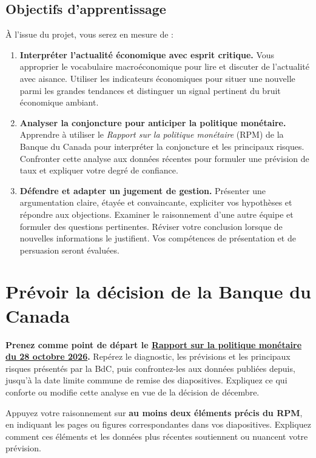 \documentclass[11pt,letterpaper]{article}
\begin{document}
\subsection{Objectifs d'apprentissage}
À l'issue du projet, vous serez en mesure de :
\begin{enumerate}
  \item \textbf{Interpréter l'actualité économique avec esprit critique.} Vous approprier le vocabulaire macroéconomique pour lire et discuter de l'actualité avec aisance. Utiliser les indicateurs économiques pour situer une nouvelle parmi les grandes tendances et distinguer un signal pertinent du bruit économique ambiant.
  \item \textbf{Analyser la conjoncture pour anticiper la politique monétaire.} Apprendre à utiliser le \textit{Rapport sur la politique monétaire} (RPM) de la Banque du Canada pour interpréter la conjoncture et les principaux risques. Confronter cette analyse aux données récentes pour formuler une prévision de taux et expliquer votre degré de confiance.
  \item \textbf{Défendre et adapter un jugement de gestion.} Présenter une argumentation claire, étayée et convaincante, expliciter vos hypothèses et répondre aux objections. Examiner le raisonnement d'une autre équipe et formuler des questions pertinentes. Réviser votre conclusion lorsque de nouvelles informations le justifient. Vos compétences de présentation et de persuasion seront évaluées.
\end{enumerate}

\clearpage

\begingroup
\setlength{\parskip}{2pt}
\section{Prévoir la décision de la Banque du Canada}
\textbf{Prenez comme point de départ le \href{https://www.banqueducanada.ca/publication/rpm/}{Rapport sur la politique monétaire du 28 octobre 2026}.} Repérez le diagnostic, les prévisions et les principaux risques présentés par la BdC, puis confrontez-les aux données publiées depuis, jusqu'à la date limite commune de remise des diapositives. Expliquez ce qui conforte ou modifie cette analyse en vue de la décision de décembre.

Appuyez votre raisonnement sur \textbf{au moins deux éléments précis du RPM}, en indiquant les pages ou figures correspondantes dans vos diapositives. Expliquez comment ces éléments et les données plus récentes soutiennent ou nuancent votre prévision.
\end{document}
